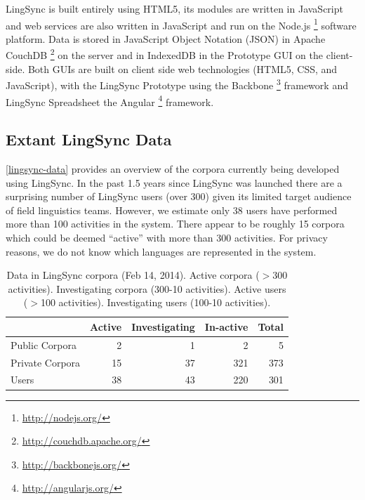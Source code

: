\documentclass[11pt]{article}
\begin{document}
LingSync is built entirely using HTML5, its modules are written in JavaScript and web services are also written in JavaScript and run on the Node.js%
\footnote{\url{http://nodejs.org/}} %
software platform. Data is stored in JavaScript Object Notation (JSON) in Apache CouchDB%
\footnote{\url{http://couchdb.apache.org/}} %
on the server and in IndexedDB in the Prototype GUI on the client-side. Both GUIs are
built on client side web technologies (HTML5, CSS, and JavaScript), with the LingSync
Prototype using the Backbone%
\footnote{\url{http://backbonejs.org/}} %
framework and LingSync Spreadsheet the Angular%
\footnote{\url{http://angularjs.org/}} %
framework.


\subsection{Extant LingSync Data}

\autoref{lingsync-data} provides an overview of the corpora currently being
developed using LingSync. In the past 1.5 years since LingSync was launched
there are a surprising number of LingSync users (over 300) given its limited
target audience of field linguistics teams. However, we estimate only 38 users
have performed more than 100 activities in the system. There appear to be
roughly 15 corpora which could be deemed ``active'' with more than 300
activities. For privacy reasons, we do not know which languages are represented
in the system.

\begin{table}[h]
\begin{center}
\scriptsize
\begin{tabular}{lrrrr}
      \toprule
                     ~ &  Active & Investigating & In-active & Total\\
      \midrule
      Public Corpora  &       2 &   1 &   2 & 5 \\ 
      Private Corpora &      15 &  37 & 321 & 373\\ 
      Users           &      38 &  43 & 220 & 301 \\
      \bottomrule

\end{tabular}
\caption{Data in LingSync corpora (Feb 14, 2014).
Active corpora ($>$300 activities). Investigating corpora (300-10 activities). Active users ($>$100 activities). Investigating users (100-10 activities).}
\label{lingsync-data}
 \end{center}
 \normalsize
\end{table}
\end{document}

